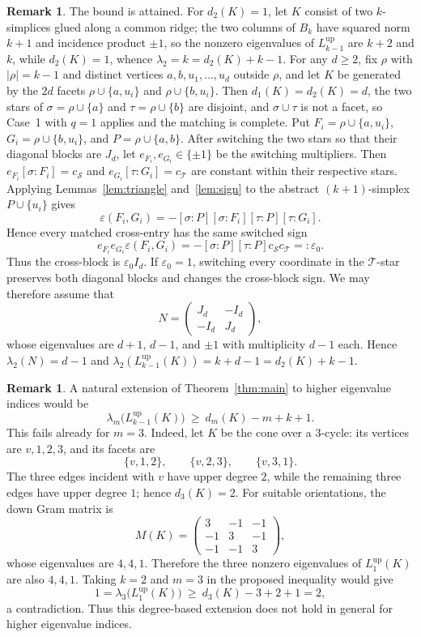 \documentclass[11pt,reqno]{amsart}
\numberwithin{equation}{section}
\theoremstyle{plain}
\theoremstyle{definition}
\newtheorem{remark}[theorem]{Remark}
\newcommand{\Lup}{L^{\mathrm{up}}}
\newcommand{\eps}{\varepsilon}
\newcommand{\Sset}{\mathcal S}
\newcommand{\Tset}{\mathcal T}
\begin{document}
\begin{remark}
The bound is attained. For $d_2(K)=1$, let $K$ consist of two $k$-simplices glued along a common
ridge; the two columns of $B_k$ have squared norm $k+1$ and incidence product $\pm1$, so the
nonzero eigenvalues of $\Lup_{k-1}$ are $k+2$ and $k$, while $d_2(K)=1$, whence
$\lambda_2=k=d_2(K)+k-1$. For any $d\ge2$, fix $\rho$ with $|\rho|=k-1$ and distinct vertices
$a,b,u_1,\dots,u_d$ outside $\rho$, and let $K$ be generated by the $2d$ facets
$\rho\cup\{a,u_i\}$ and $\rho\cup\{b,u_i\}$. Then $d_1(K)=d_2(K)=d$, the two stars of
$\sigma=\rho\cup\{a\}$ and $\tau=\rho\cup\{b\}$ are disjoint, and $\sigma\cup\tau$ is not a
facet, so Case~1 with $q=1$ applies and the matching is complete. Put
$F_i=\rho\cup\{a,u_i\}$, $G_i=\rho\cup\{b,u_i\}$, and
$P=\rho\cup\{a,b\}$. After switching the two stars so that their diagonal blocks are $J_d$,
let $e_{F_i},e_{G_i}\in\{\pm1\}$ be the switching multipliers. Then
$e_{F_i}[\sigma:F_i]=c_{\Sset}$ and $e_{G_i}[\tau:G_i]=c_{\Tset}$ are constant within their
respective stars. Applying Lemmas~\ref{lem:triangle} and~\ref{lem:sign} to the abstract
$(k+1)$-simplex $P\cup\{u_i\}$ gives
\[
  \eps(F_i,G_i)
  =-[\sigma:P][\sigma:F_i][\tau:P][\tau:G_i].
\]
Hence every matched cross-entry has the same switched sign
\[
  e_{F_i}e_{G_i}\eps(F_i,G_i)
  =-[\sigma:P][\tau:P]c_{\Sset}c_{\Tset}=:\eps_0.
\]
Thus the cross-block is $\eps_0I_d$. If $\eps_0=1$, switching every coordinate in the
$\Tset$-star preserves both diagonal blocks and changes the cross-block sign. We may therefore
assume that
\[
  N=\begin{pmatrix} J_d & -I_d\\ -I_d & J_d\end{pmatrix},
\]
whose eigenvalues are $d+1$, $d-1$, and $\pm1$ with multiplicity $d-1$ each. Hence
$\lambda_2(N)=d-1$ and $\lambda_2(\Lup_{k-1}(K))=k+d-1=d_2(K)+k-1$.
\end{remark}

\begin{remark}
A natural extension of Theorem~\ref{thm:main} to higher eigenvalue indices would be
\[
  \lambda_m\bigl(\Lup_{k-1}(K)\bigr)\ \ge\ d_m(K)-m+k+1 .
\]
This fails already for $m=3$. Indeed, let $K$ be the cone over a $3$-cycle: its vertices are
$v,1,2,3$, and its facets are
\[
  \{v,1,2\},\qquad \{v,2,3\},\qquad \{v,3,1\}.
\]
The three edges incident with $v$ have upper degree $2$, while the remaining three edges have
upper degree $1$; hence $d_3(K)=2$. For suitable orientations, the down Gram matrix is
\[
  M(K)=
  \begin{pmatrix}
    3&-1&-1\\
    -1&3&-1\\
    -1&-1&3
  \end{pmatrix},
\]
whose eigenvalues are $4,4,1$. Therefore the three nonzero eigenvalues of $\Lup_1(K)$ are also
$4,4,1$. Taking $k=2$ and $m=3$ in the proposed inequality would give
\[
  1=\lambda_3\bigl(\Lup_1(K)\bigr)\ \ge\ d_3(K)-3+2+1=2,
\]
a contradiction. Thus this degree-based extension does not hold in general for higher
eigenvalue indices.
\end{remark}
\end{document}
